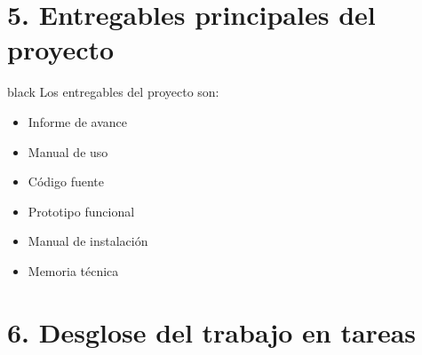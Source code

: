 \documentclass[11pt]{charter}
\begin{document}
\section{5. Entregables principales del proyecto}
\label{sec:entregables}

\begin{consigna}{black}
Los entregables del proyecto son:

\begin{itemize}
\item Informe de avance
\item Manual de uso
\item Código fuente
\item Prototipo funcional
\item Manual de instalación
\item Memoria técnica

\end{itemize}

\end{consigna}

\section{6. Desglose del trabajo en tareas}
\label{sec:wbs}
\end{document}
